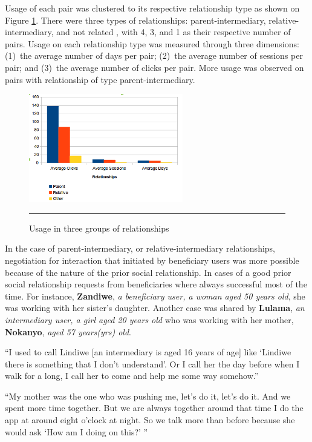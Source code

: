 Usage of each pair  was clustered to its respective relationship type as shown on Figure \ref{figure:relation}. There were three types of relationships: parent-intermediary, relative-intermediary, and not related , with 4, 3, and 1 as their respective number of pairs. Usage on each relationship type was measured through three dimensions: (1)~the average number of days per pair; (2)~the average number of sessions per pair; and (3)~the average number of clicks per pair. More usage was observed on pairs with relationship of type parent-intermediary. 
\begin{figure}[htbp]
  \centering
    \includegraphics[width=0.6\textwidth]{Figures/relationships.png}
    \rule{35em}{0.5pt}
  \caption{Usage in three groups of relationships\citep{katule2016leveraging}}
  \label{figure:relation}
\end{figure}
In the case of parent-intermediary, or relative-intermediary relationships, negotiation for interaction that initiated by beneficiary users was more possible because of the nature of the prior social relationship. In cases of a good prior social relationship requests from beneficiaries where always successful most of the time. For instance, \textbf{Zandiwe}, \emph{a beneficiary user, a woman aged 50 years old}, she was working with her sister's daughter. Another case was shared by  \textbf{Lulama}, \emph{an intermediary user, a girl aged 20 years old} who was working with her mother, \textbf{Nokanyo}, \emph{aged 57 years(yrs) old}. 

 {``I used to call Lindiwe [an intermediary is aged 16 years of age] like `Lindiwe there is something that I don't understand'. Or I call her the day before when I walk for a long, I call her to come and help me some way somehow.''}

 {``My mother was the one who was pushing me, let’s do it, let’s do it. And we spent more time together. But we are always together around that time I do the app at around eight o'clock at night. So we talk more than before because she would ask `How am I doing on this?' ''}

